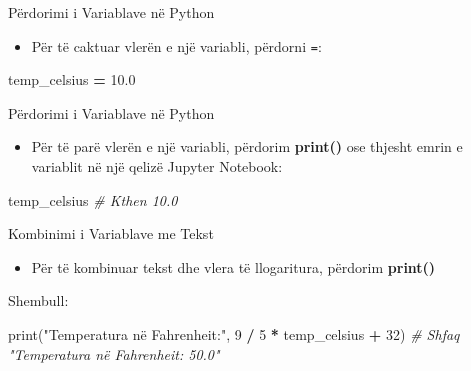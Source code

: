 \documentclass[
  ignorenonframetext,
]{beamer}
\newenvironment{Shaded}{\begin{snugshade}}{\end{snugshade}}
\newcommand{\BuiltInTok}[1]{#1}
\newcommand{\CommentTok}[1]{\textcolor[rgb]{0.56,0.35,0.01}{\textit{#1}}}
\newcommand{\DecValTok}[1]{\textcolor[rgb]{0.00,0.00,0.81}{#1}}
\newcommand{\FloatTok}[1]{\textcolor[rgb]{0.00,0.00,0.81}{#1}}
\newcommand{\NormalTok}[1]{#1}
\newcommand{\OperatorTok}[1]{\textcolor[rgb]{0.81,0.36,0.00}{\textbf{#1}}}
\newcommand{\StringTok}[1]{\textcolor[rgb]{0.31,0.60,0.02}{#1}}
\providecommand{\tightlist}{%
  \setlength{\itemsep}{0pt}\setlength{\parskip}{0pt}}
\begin{document}
\begin{frame}[fragile]{Përdorimi i Variablave në Python}
\protect\hypertarget{puxebrdorimi-i-variablave-nuxeb-python}{}
\begin{itemize}
\tightlist
\item
  Për të caktuar vlerën e një variabli, përdorni \texttt{=}:
\end{itemize}

\begin{Shaded}
\begin{Highlighting}[]
\NormalTok{  temp\_celsius }\OperatorTok{=} \FloatTok{10.0}
\end{Highlighting}
\end{Shaded}
\end{frame}

\begin{frame}[fragile]{Përdorimi i Variablave në Python}
\protect\hypertarget{puxebrdorimi-i-variablave-nuxeb-python-1}{}
\begin{itemize}
\tightlist
\item
  Për të parë vlerën e një variabli, përdorim \textbf{print()} ose
  thjesht emrin e variablit në një qelizë Jupyter Notebook:
\end{itemize}

\begin{Shaded}
\begin{Highlighting}[]
\NormalTok{temp\_celsius  }\CommentTok{\# Kthen 10.0}
\end{Highlighting}
\end{Shaded}
\end{frame}

\begin{frame}[fragile]{Kombinimi i Variablave me Tekst}
\protect\hypertarget{kombinimi-i-variablave-me-tekst}{}
\begin{itemize}
\tightlist
\item
  Për të kombinuar tekst dhe vlera të llogaritura, përdorim
  \textbf{print()}
\end{itemize}

Shembull:

\begin{Shaded}
\begin{Highlighting}[]
\BuiltInTok{print}\NormalTok{(}\StringTok{"Temperatura në Fahrenheit:"}\NormalTok{, }\DecValTok{9} \OperatorTok{/} \DecValTok{5} \OperatorTok{*}\NormalTok{ temp\_celsius }\OperatorTok{+} \DecValTok{32}\NormalTok{)  }\CommentTok{\# Shfaq "Temperatura në Fahrenheit: 50.0"}
\end{Highlighting}
\end{Shaded}
\end{frame}
\end{document}

